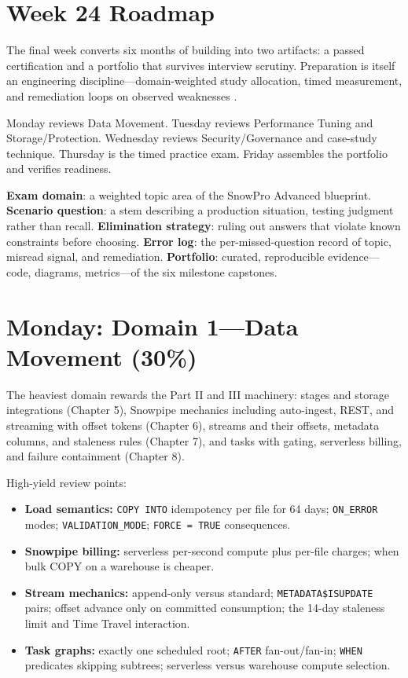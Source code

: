 \section{Week 24 Roadmap}
The final week converts six months of building into two artifacts: a passed certification and a portfolio that survives interview scrutiny. Preparation is itself an engineering discipline---domain-weighted study allocation, timed measurement, and remediation loops on observed weaknesses \cite{snowproExamGuide}.

Monday reviews Data Movement. Tuesday reviews Performance Tuning and Storage/Protection. Wednesday reviews Security/Governance and case-study technique. Thursday is the timed practice exam. Friday assembles the portfolio and verifies readiness.

\begin{keyterms}
\textbf{Exam domain}: a weighted topic area of the SnowPro Advanced blueprint.\quad
\textbf{Scenario question}: a stem describing a production situation, testing judgment rather than recall.\quad
\textbf{Elimination strategy}: ruling out answers that violate known constraints before choosing.\quad
\textbf{Error log}: the per-missed-question record of topic, misread signal, and remediation.\quad
\textbf{Portfolio}: curated, reproducible evidence---code, diagrams, metrics---of the six milestone capstones.
\end{keyterms}

\section{Monday: Domain 1---Data Movement (30\%)}
The heaviest domain rewards the Part II and III machinery: stages and storage integrations (Chapter 5), Snowpipe mechanics including auto-ingest, REST, and streaming with offset tokens (Chapter 6), streams and their offsets, metadata columns, and staleness rules (Chapter 7), and tasks with gating, serverless billing, and failure containment (Chapter 8).

High-yield review points:
\begin{itemize}
    \item \textbf{Load semantics:} \texttt{COPY INTO} idempotency per file for 64 days; \texttt{ON\_ERROR} modes; \texttt{VALIDATION\_MODE}; \texttt{FORCE = TRUE} consequences.
    \item \textbf{Snowpipe billing:} serverless per-second compute plus per-file charges; when bulk COPY on a warehouse is cheaper.
    \item \textbf{Stream mechanics:} append-only versus standard; \texttt{METADATA\$ISUPDATE} pairs; offset advance only on committed consumption; the 14-day staleness limit and Time Travel interaction.
    \item \textbf{Task graphs:} exactly one scheduled root; \texttt{AFTER} fan-out/fan-in; \texttt{WHEN} predicates skipping subtrees; serverless versus warehouse compute selection.
\end{itemize}

